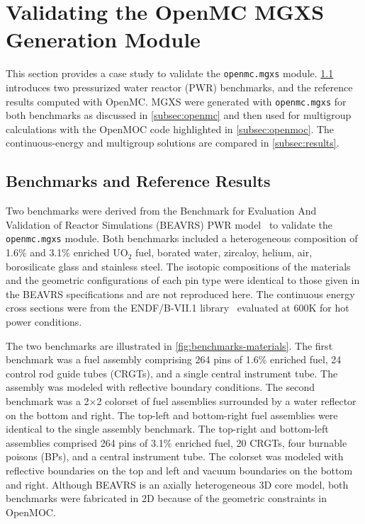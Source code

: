 \section{Validating the OpenMC MGXS Generation Module}
\label{sec:validate}

This section provides a case study to validate the \texttt{openmc.mgxs} module. \cref{subsec:benchmarks} introduces two pressurized water reactor (PWR) benchmarks, and the reference results computed with OpenMC. MGXS were generated with \texttt{openmc.mgxs} for both benchmarks as discussed in \cref{subsec:openmc} and then used for multigroup calculations with the OpenMOC code highlighted in \cref{subsec:openmoc}. The continuous-energy and multigroup solutions are compared in \cref{subsec:results}.


\subsection{Benchmarks and Reference Results}
\label{subsec:benchmarks}

Two benchmarks were derived from the Benchmark for Evaluation And Validation of Reactor Simulations (BEAVRS) PWR model~\cite{horelik2013beavrs} to validate the \texttt{openmc.mgxs} module. Both benchmarks included a heterogeneous composition of 1.6\% and 3.1\% enriched UO$_2$ fuel, borated water, zircaloy, helium, air, borosilicate glass and stainless steel. The isotopic compositions of the materials and the geometric configurations of each pin type were identical to those given in the BEAVRS specifications and are not reproduced here. The continuous energy cross sections were from the ENDF/B-VII.1 library~\cite{mcnpx2003manual} evaluated at 600K for hot power conditions.

The two benchmarks are illustrated in \cref{fig:benchmarks-materials}. The first benchmark was a fuel assembly comprising 264 pins of 1.6\% enriched fuel, 24 control rod guide tubes (CRGTs), and a single central instrument tube. The assembly was modeled with reflective boundary conditions. The second benchmark was a 2$\times$2 colorset of fuel assemblies surrounded by a water reflector on the bottom and right. The top-left and bottom-right fuel assemblies were identical to the single assembly benchmark. The top-right and bottom-left assemblies comprised 264 pins of 3.1\% enriched fuel, 20 CRGTs, four burnable poisons (BPs), and a central instrument tube. The colorset was modeled with reflective boundaries on the top and left and vacuum boundaries on the bottom and right. Although BEAVRS is an axially heterogeneous 3D core model, both benchmarks were fabricated in 2D because of the geometric constraints in OpenMOC.

